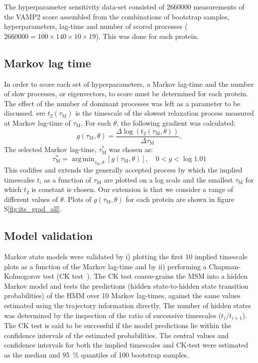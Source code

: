 \documentclass[journal=jacsat,manuscript=article]{achemso}
\DeclareMathOperator*{\argmin}{arg\,min}
\newcommand*\sref[1]{%
    S\ref{#1}}
\begin{document}
The hyperparameter sensitivity data-set consisted of \num{2660000} measurements of the VAMP2 score assembled from the combinations of bootstrap samples, hyperparameters, lag-time and number of scored processes  ($\num{2660000}=100 \times 140 \times 10 \times 19$). This was done for each protein. 

\subsection{Markov lag time}
In order to score each set of hyperparameters, a Markov lag-time and the number of slow processes, or eigenvectors, to score must be determined for each protein. The effect of the number of dominant processes was left as a parameter to be discussed. ere $t_{2}(\tau_{\mathrm{M}})$ is the timescale of the slowest relaxation process measured at Markov lag-time of $\tau_{\mathrm{M}}$. 
For each $\theta$, the following gradient was calculated:
\begin{equation}
    g(\tau_{\mathrm{M}}, \theta) = \frac{\Delta \log{\left(t_{2}(\tau_{\mathrm{M}}, \theta)\right)}}{\Delta \tau_{\mathrm{M}}}, 
\end{equation}\label{eqn:choose_lag_1}
The selected Markov lag-time, $\tau^{*}_{\mathrm{M}}$ was chosen as:
\begin{equation}
    \tau^{*}_{\mathrm{M}}  = \argmin_{\tau_{\mathrm{M}}, \theta}\left[g(\tau_{\mathrm{M}}, \theta)\right], \quad 0 < g < \log{1.01}
\end{equation}\label{eqn:choose_lag_2}
This codifies and extends the generally accepted process by which the implied timescales $t_{i}$ as a function of $\tau_{\mathrm{M}}$ are plotted on a log scale and the smallest $\tau_{\mathrm{M}}$ for which $t_{2}$ is constant is chosen. Our extension is that we consider a range of different values of $\theta$. Plots of $g(\tau_{\mathrm{M}}, \theta)$ for each protein are shown  in figure \sref{fig:its_grad_all}. 

\subsection{Model validation}

Markov state models were validated by i) plotting the first \num{10} implied timescale plots as a function of the Markov lag-time and by ii) performing a Chapman-Kolmogorov test (CK test~\cite{noe_projected_2013}). The CK test coarse-grains the MSM into a hidden Markov model and tests the predictions (hidden state-to-hidden state transition probabilities) of the HMM over 10 Markov lag-times, against the same values estimated using the trajectory information directly. The number of hidden states was determined by the inspection of the ratio of successive timescales ($t_{i}/t_{i+1}$). The CK test is said to be successful if the model predictions lie within the confidence intervals of the estimated probabilities. The central values and confidence intervals for both the implied timescales and CK-test were estimated as the median and \SI{95}{\percent} quantiles of \num{100} bootstrap samples. 
\end{document}
